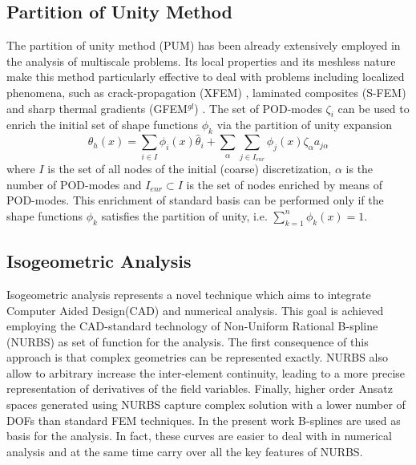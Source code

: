 \documentclass[3p]{article}
\begin{document}
\subsection*{Partition of Unity Method}
The partition of unity method (PUM) \cite{Babuska1997} has been already extensively employed in the analysis of multiscale problems. Its local properties and its meshless nature make this method particularly effective to deal with problems including localized phenomena, such as crack-propagation (XFEM) \cite{Moes2002}, laminated composites (S-FEM)\cite{fish_s-version_1996} and sharp thermal gradients (GFEM$^{gl}$) \cite{Ohara2013}.
The set of POD-modes $\zeta_{i}$ can be used to enrich the initial set of shape functions $\phi_{k}$ via the partition of unity expansion 
\begin{equation}
\theta_{h}(x) = \sum_{i\in I} \phi_{i}(x)\hat{\theta}_{i} + \sum_{\alpha}\sum_{j\in I_{enr}} \phi_{j}(x)\zeta_{\alpha}a_{j\alpha}
\label{PartitionOfUnity}
\end{equation}
where $I$ is the set of all nodes of the initial (coarse) discretization, $\alpha$ is the number of POD-modes and $I_{enr}\subset I$ is the set of nodes enriched by means of POD-modes. This enrichment of standard basis can be performed only if the shape functions $\phi_{k}$ satisfies the partition of unity, i.e. $\sum_{k=1}^{n}\phi_{k}(x)=1$. 


\subsection*{Isogeometric Analysis}
Isogeometric analysis represents a novel technique which aims to integrate Computer Aided Design(CAD) and numerical analysis. This goal is achieved employing the CAD-standard technology of Non-Uniform Rational B-spline (NURBS) as set of function for the analysis. The first consequence of this approach is that complex geometries can be represented exactly. NURBS also allow to arbitrary increase the inter-element continuity, leading to a more precise representation of derivatives of the field variables. Finally, higher order Ansatz spaces generated using NURBS capture complex solution with a lower number of DOFs than standard FEM techniques.
In the present work B-splines are used as basis for the analysis. In fact, these curves are easier to deal with in numerical analysis and at the same time carry over all the key features of NURBS.
\end{document}
